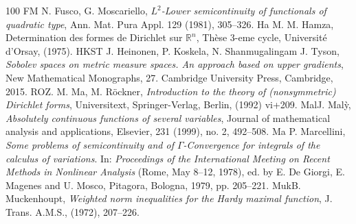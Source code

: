 \documentclass[11pt,leqno]{amsart}
\theoremstyle{remark}
\theoremstyle{definition}
\theoremstyle{definition}
\newcommand{\bbR}{{\mathbb{R}}}
\newcommand{\R}{\bbR}
\begin{document}
\begin{thebibliography}{100}
{FM} {\sc N. Fusco, G. Moscariello}, {\em $L^2$-Lower semicontinuity of functionals of quadratic type}, Ann. Mat. Pura Appl. { 129} (1981), 305--326.
\bibitem%
{Ha} {\sc M. M. Hamza}, Determination des formes de Dirichlet sur $\R^n$, Th\`ese 3-eme cycle, Universit\'e d’Orsay, (1975).
\bibitem%
{HKST} {\sc J. Heinonen, P. Koskela, N. Shanmugalingam  J. Tyson}, {\em 
Sobolev spaces on metric measure spaces. An approach based on upper gradients}, New Mathematical Monographs, 27. Cambridge University Press, Cambridge, 2015.
\bibitem%
{RO}{\sc Z. M. Ma, M.  R\"{o}ckner}, {\em Introduction to the theory of (nonsymmetric) Dirichlet forms}, Universitext, Springer-Verlag, Berlin, (1992) vi+209.
\bibitem%
{Mal}{\sc  J. Mal{\`y}}, {\em Absolutely continuous functions of several variables}, Journal of mathematical analysis and applications, Elsevier, { 231} (1999), no. 2, 492--508.
\bibitem%
{Ma} {\sc P. Marcellini}, {\em Some problems of semicontinuity and of $\Gamma$-Convergence for integrals of the calculus of variations}.  In: {\it Proceedings of the International Meeting on Recent Methods in Nonlinear Analysis} (Rome, May 8--12, 1978), ed. by E. De Giorgi, E. Magenes and U. Mosco, Pitagora, Bologna, 1979, pp. 205--221.
\bibitem%
{Muk}{\sc B. Muckenhoupt}, {\em Weighted norm inequalities for the Hardy maximal function}, 
J. Trans. A.M.S., (1972), 207--226.
\end{thebibliography}
\end{document}
